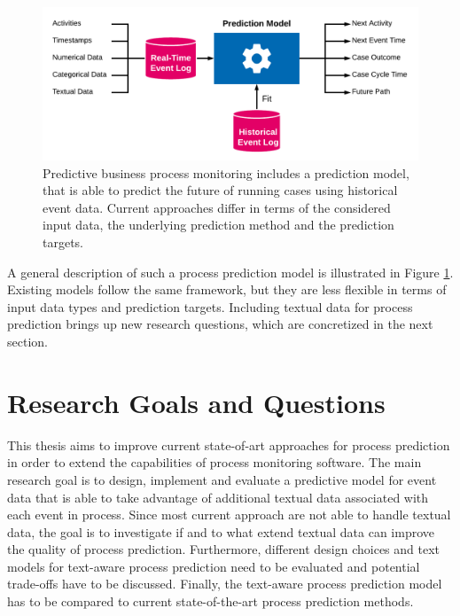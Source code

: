 \begin{figure}[htbp!]
	\centering
	\includegraphics[width=\textwidth]{figures/problem-description}
	\caption[General process prediction model]{Predictive business process monitoring includes a prediction model, that is able to predict the future of running cases using historical event data. Current approaches differ in terms of the considered input data, the underlying prediction method and the prediction targets.}
	\label{fig:/problem-description}
\end{figure}

A general description of such a process prediction model is illustrated in Figure \ref{fig:/problem-description}.
Existing models follow the same framework, but they are less flexible in terms of input data types and prediction targets.
Including textual data for process prediction brings up new research questions, which are concretized in the next section.

\section{Research Goals and Questions}

This thesis aims to improve current state-of-art approaches for process prediction in order to extend the capabilities of process monitoring software.
The main research goal is to design, implement and evaluate a predictive model for event data that is able to take advantage of additional textual data associated with each event in process.
Since most current approach are not able to handle textual data, the goal is to investigate if and to what extend textual data can improve the quality of process prediction.
Furthermore, different design choices and text models for text-aware process prediction need to be evaluated and potential trade-offs have to be discussed.
Finally, the text-aware process prediction model has to be compared to current state-of-the-art process prediction methods.

